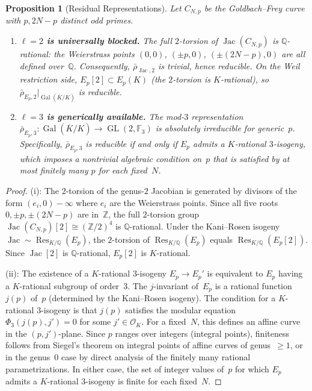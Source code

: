 \documentclass[11pt,a4paper]{article}
\newtheorem{proposition}[theorem]{Proposition}
\theoremstyle{definition}
\DeclareMathOperator{\Gal}{Gal}
\DeclareMathOperator{\GL}{GL}
\DeclareMathOperator{\Jac}{Jac}
\DeclareMathOperator{\Res}{Res}
\begin{document}
\begin{proposition}[Residual Representations]\label{prop:residual}
Let $C_{N,p}$ be the Goldbach--Frey curve with $p, 2N-p$ distinct odd primes.
\begin{enumerate}
    \item[\textup{(i)}] \textbf{$\ell = 2$ is universally blocked.} The full $2$-torsion of $\Jac(C_{N,p})$ is $\mathbb{Q}$-rational: the Weierstrass points $(0,0)$, $(\pm p, 0)$, $(\pm(2N-p), 0)$ are all defined over~$\mathbb{Q}$. Consequently, $\bar{\rho}_{\Jac,2}$ is trivial, hence reducible. On the Weil restriction side, $E_p[2] \subset E_p(K)$ \textup{(}the $2$-torsion is $K$-rational\textup{)}, so $\bar{\rho}_{E_p,2}|_{\Gal(\overline{K}/K)}$ is reducible.

    \item[\textup{(ii)}] \textbf{$\ell = 3$ is generically available.} The mod-$3$ representation $\bar{\rho}_{E_p,3} : \Gal(\overline{K}/K) \to \GL(2, \mathbb{F}_3)$ is absolutely irreducible for generic~$p$. Specifically, $\bar{\rho}_{E_p,3}$ is reducible if and only if $E_p$ admits a $K$-rational $3$-isogeny, which imposes a nontrivial algebraic condition on~$p$ that is satisfied by at most finitely many $p$ for each fixed~$N$.
\end{enumerate}
\end{proposition}
\begin{proof}
(i): The $2$-torsion of the genus-$2$ Jacobian is generated by divisors of the form $(e_i, 0) - \infty$ where $e_i$ are the Weierstrass points. Since all five roots $0, \pm p, \pm(2N-p)$ are in~$\mathbb{Z}$, the full $2$-torsion group $\Jac(C_{N,p})[2] \cong (\mathbb{Z}/2)^4$ is $\mathbb{Q}$-rational. Under the Kani--Rosen isogeny $\Jac \sim \Res_{K/\mathbb{Q}}(E_p)$, the $2$-torsion of $\Res_{K/\mathbb{Q}}(E_p)$ equals $\Res_{K/\mathbb{Q}}(E_p[2])$. Since $\Jac[2]$ is $\mathbb{Q}$-rational, $E_p[2]$ is $K$-rational.

(ii): The existence of a $K$-rational $3$-isogeny $E_p \to E_p'$ is equivalent to $E_p$ having a $K$-rational subgroup of order~$3$. The $j$-invariant of~$E_p$ is a rational function $j(p)$ of~$p$ (determined by the Kani--Rosen isogeny). The condition for a $K$-rational $3$-isogeny is that $j(p)$ satisfies the modular equation $\Phi_3(j(p), j') = 0$ for some $j' \in \mathcal{O}_K$. For a fixed~$N$, this defines an affine curve in the $(p, j')$-plane. Since $p$ ranges over integers (integral points), finiteness follows from Siegel's theorem on integral points of affine curves of genus~$\ge 1$, or in the genus~$0$ case by direct analysis of the finitely many rational parametrizations. In either case, the set of integer values of~$p$ for which $E_p$ admits a $K$-rational $3$-isogeny is finite for each fixed~$N$. \qedhere
\end{proof}
\end{document}
